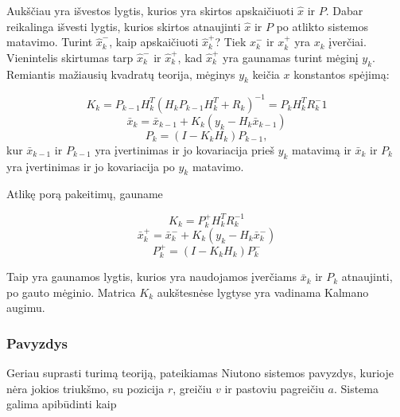     Aukščiau yra išvestos lygtis, kurios yra skirtos apskaičiuoti $\hat{x}$ ir $P$.
    Dabar reikalinga išvesti lygtis, kurios skirtos atnaujinti $\hat{x}$ ir $P$ po atlikto sistemos matavimo.
    Turint $\hat{x}_k^-$, kaip apskaičiuoti $\hat{x}_k^+$? Tiek $x_k^-$ ir $x_k^+$ yra $x_k$ įverčiai.
    Vienintelis skirtumas tarp $\hat{x}_k^-$ ir $\hat{x}_k^+$, kad $\hat{x}_k^+$ yra gaunamas turint mėginį $y_k$.
    Remiantis mažiausių kvadratų teorija, mėginys $y_k$ keičia $x$ konstantos spėjimą:

    \begin{equation}
        K_k = P_{k-1}H_k^T(H_kP_{k-1}H_k^T + R_k)^{-1} = P_kH_k^TR_k^-1
    \end{equation}
    \begin{equation}
        \bar{x}_k = \bar{x}_{k-1} + K_k(y_k - H_k\bar{x}_{k-1})
    \end{equation}
    \begin{equation}
        P_k = (I - K_kH_k)P_{k-1},
    \end{equation}
    kur $\bar{x}_{k-1}$ ir $P_{k-1}$ yra įvertinimas ir jo kovariacija prieš $y_k$ matavimą ir $\bar{x}_k$ ir $P_k$ yra įvertinimas ir jo kovariacija po $y_k$ matavimo.

    Atlikę porą pakeitimų, gauname

    \begin{equation}
        K_k = P_{k}^+H_k^TR_k^{-1}
    \end{equation}
    \begin{equation}
        \bar{x}_k^+ = \bar{x}_k^- + K_k(y_k - H_k\bar{x}_k^-)
    \end{equation}
    \begin{equation}
        P_k^+ = (I-K_kH_k)P_{k}^-
    \end{equation}

    Taip yra gaunamos lygtis, kurios yra naudojamos įverčiams $\bar{x}_k$ ir $P_k$ atnaujinti, po gauto mėginio.
    Matrica $K_k$ aukštesnėse lygtyse yra vadinama Kalmano augimu.

    \subsubsection{Pavyzdys}

    Geriau suprasti turimą teoriją, pateikiamas Niutono sistemos pavyzdys, kurioje nėra jokios triukšmo, su pozicija $r$, greičiu $v$ ir pastoviu pagreičiu $a$.
    Sistema galima apibūdinti kaip

